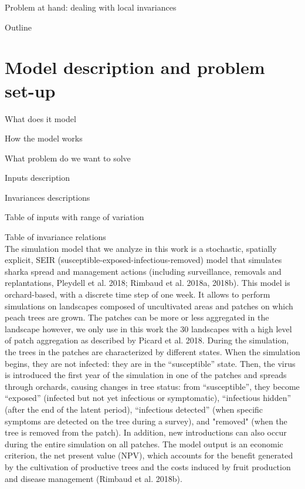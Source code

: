 Problem at hand: dealing with local invariances

Outline

\section{Model description and problem set-up}

What does it model

How the model works

What problem do we want to solve

Inputs description

Invariances descriptions

Table of inputs with range of variation

Table of invariance relations
\\

The simulation model that we analyze in this work is a stochastic, spatially explicit, SEIR (susceptible-exposed-infectious-removed) model that simulates sharka spread and management actions (including surveillance, removals and replantations, Pleydell et al. 2018; Rimbaud et al. 2018a, 2018b).
This model is orchard-based, with a discrete time step of one week. It allows to perform simulations on landscapes composed of uncultivated areas and patches on which peach trees are grown. The patches can be more or less aggregated in the landscape however, we only use in this work the 30 landscapes with a high level of patch aggregation as described by Picard et al. 2018. During the simulation, the trees in the patches are characterized by different states. When the simulation begins, they are not infected: they are in the “susceptible” state. Then, the virus is introduced the first year of the simulation in one of the patches and spreads through orchards, causing changes in tree status: from “susceptible”, they become “exposed” (infected but not yet infectious or symptomatic), “infectious hidden” (after the end of the latent period), “infectious detected” (when specific symptoms are detected on the tree during a survey), and "removed" (when the tree is removed from the patch). In addition, new introductions can also occur during the entire simulation on all patches.
The model output is an economic criterion, the net present value (NPV), which accounts for the benefit generated by the cultivation of productive trees and the costs induced by fruit production and disease management (Rimbaud et al. 2018b).

